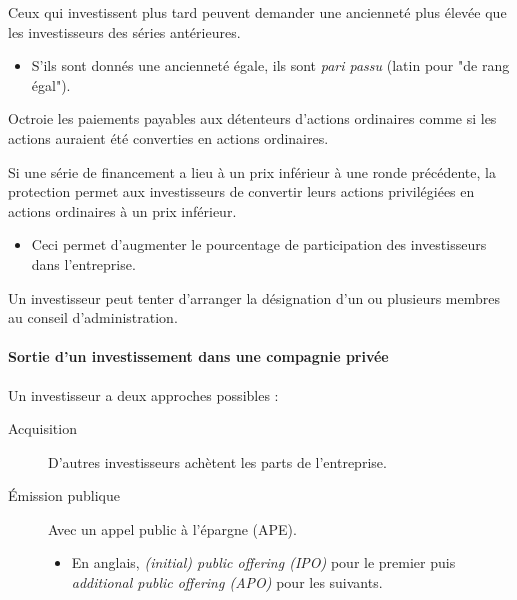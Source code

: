\documentclass[10pt, french]{article}
\begin{document}
\begin{multicols*}{2}
\begin{definitionNOHFILLpropos}[Ancienneté]
Ceux qui investissent plus tard peuvent demander une ancienneté plus élevée que les investisseurs des séries antérieures.
\begin{itemize}
	\item	S'ils sont donnés une ancienneté égale, ils sont \textit{pari passu} (latin pour "de rang égal").
\end{itemize}
\end{definitionNOHFILLpropos}

\begin{definitionNOHFILLpropos}
Octroie les paiements payables aux détenteurs d'actions ordinaires comme si les actions auraient été converties en actions ordinaires.
\end{definitionNOHFILLpropos}

\begin{definitionNOHFILLpropos}
Si une série de financement a lieu à un prix inférieur à une ronde précédente, la protection permet aux investisseurs de convertir leurs actions privilégiées en actions ordinaires à un prix inférieur.
\begin{itemize}
	\item	Ceci permet d'augmenter le pourcentage de participation des investisseurs dans l'entreprise.
\end{itemize}
\end{definitionNOHFILLpropos}

\begin{definitionNOHFILLpropos}
Un investisseur peut tenter d'arranger la désignation d'un ou plusieurs membres au conseil d'administration.
\end{definitionNOHFILLpropos}


\paragraph{Sortie d'un investissement dans une compagnie privée}
Un investisseur a deux approches possibles :
\begin{description}
	\item[Acquisition]	D'autres investisseurs achètent les parts de l'entreprise.
	\item[Émission publique]	Avec un appel public à l'épargne (APE).
		\begin{itemize}
		\item	En anglais, \og \textit{(initial) public offering (IPO)} \fg{} pour le premier puis \og \textit{additional public offering (APO)} \fg{} pour les suivants.
		\end{itemize}
\end{description}



\end{multicols*}
\end{document}
